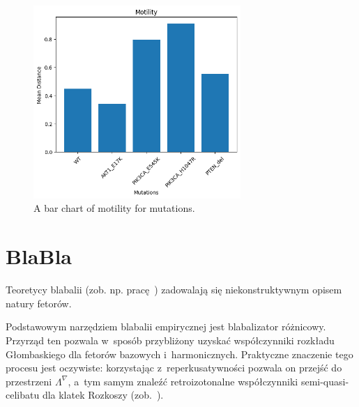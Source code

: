 \documentclass[licencjacka,en]{pracamgr}
\begin{document}
\begin{figure}[ht]
    \centering
    \includegraphics[width=0.7\textwidth]{images/motility.png}
    \caption{A bar chart of motility for mutations.}
    \label{fig:motility}
\end{figure} 





\chapter{BlaBla}
Teoretycy blabalii (zob. np. pracę~\cite{grglo}) zadowalają się
niekonstruktywnym opisem natury fetorów.

Podstawowym narzędziem blabalii empirycznej jest blabalizator
różnicowy.  Przyrząd ten pozwala w~sposób przybliżony uzyskać
współczynniki rozkładu Głombaskiego dla fetorów bazowych
i~harmonicznych.  Praktyczne znaczenie tego procesu jest oczywiste:
korzystając z~reperkusatywności pozwala on przejść do przestrzeni
$\Lambda^{\nabla}$, a~tym samym znaleźć retroizotonalne współczynniki
semi-quasi-celibatu dla klatek Rozkoszy (zob.~\cite{JR}).
\end{document}

